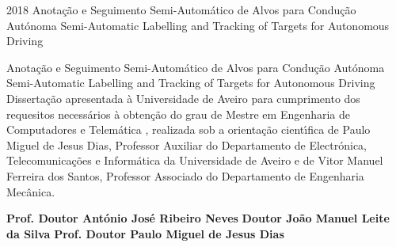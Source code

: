 \documentclass[11pt,twoside,a4paper,openright]{report}
\def\ThesisYear{2018}
\begin{document}
%
%

\TitlePage
  \HEADER{\BAR} %
         {\ThesisYear}
        {Anota\c c\~ ao e Seguimento Semi-Autom\'atico de Alvos para Condu\c c\~ ao Aut\'onoma \newline Semi-Automatic Labelling and Tracking of Targets for Autonomous Driving}
\EndTitlePage
\titlepage\ \endtitlepage %

%
%

\TitlePage
  \HEADER{}{\ThesisYear}
        {Anota\c c\~ ao e Seguimento Semi-Autom\'atico de Alvos para Condu\c c\~ ao Aut\'onoma \newline Semi-Automatic Labelling and Tracking of Targets for Autonomous Driving}
  \vspace*{15mm}
  \TEXT{}
       {Disserta\c c\~ao apresentada \`a Universidade de Aveiro para cumprimento dos requesitos
        necess\'arios \`a obten\c c\~ao do grau de Mestre em Engenharia de Computadores e Telem\'atica , realizada sob a orienta\c c\~ao
        cient\'\i fica de Paulo Miguel de Jesus Dias, Professor Auxiliar do Departamento de Electr\'onica, Telecomunica\c c\~oes e Inform\'atica da Universidade de Aveiro e de Vitor Manuel Ferreira dos Santos, Professor Associado do Departamento de Engenharia Mec\^ anica.}
\EndTitlePage
\titlepage\ \endtitlepage %

\TitlePage
  \vspace*{55mm}
       {}
       {\textbf{Prof. Doutor Ant\'onio Jos\'e Ribeiro Neves}}
  \vspace*{5mm}
       {\textbf{Doutor Jo\~ao Manuel Leite da Silva}}
  \vspace*{5mm}
  \TEXT{}
       {\textbf{Prof. Doutor Paulo Miguel de Jesus Dias}}
\EndTitlePage
\titlepage\ \endtitlepage %
\end{document}
